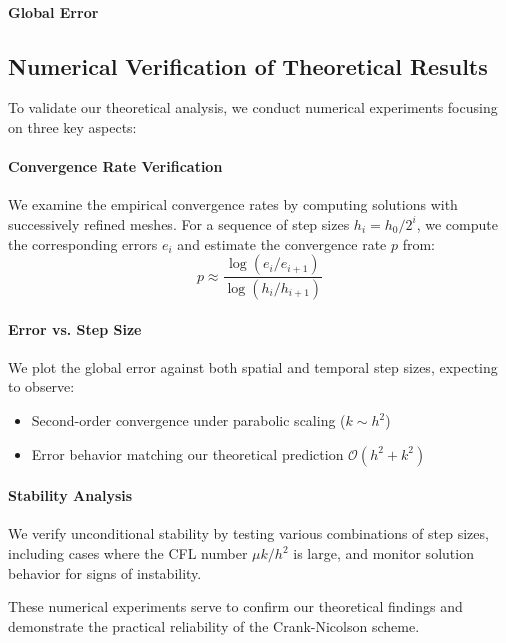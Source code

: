 \paragraph{Global Error}

\subsection{Numerical Verification of Theoretical Results}

To validate our theoretical analysis, we conduct numerical experiments focusing on three key aspects:

\paragraph{Convergence Rate Verification}
We examine the empirical convergence rates by computing solutions with successively refined meshes. For a sequence of step sizes $h_i = h_0/2^i$, we compute the corresponding errors $e_i$ and estimate the convergence rate $p$ from:
\[
  p \approx \frac{\log(e_i/e_{i+1})}{\log(h_i/h_{i+1})}
\]

\paragraph{Error vs. Step Size}
We plot the global error against both spatial and temporal step sizes, expecting to observe:
\begin{itemize}
  \item Second-order convergence under parabolic scaling ($k \sim h^2$)
  \item Error behavior matching our theoretical prediction $\mathcal{O}(h^2 + k^2)$
\end{itemize}

\paragraph{Stability Analysis}
We verify unconditional stability by testing various combinations of step sizes, including cases where the CFL number $\mu k/h^2$ is large, and monitor solution behavior for signs of instability.

These numerical experiments serve to confirm our theoretical findings and demonstrate the practical reliability of the Crank-Nicolson scheme.


